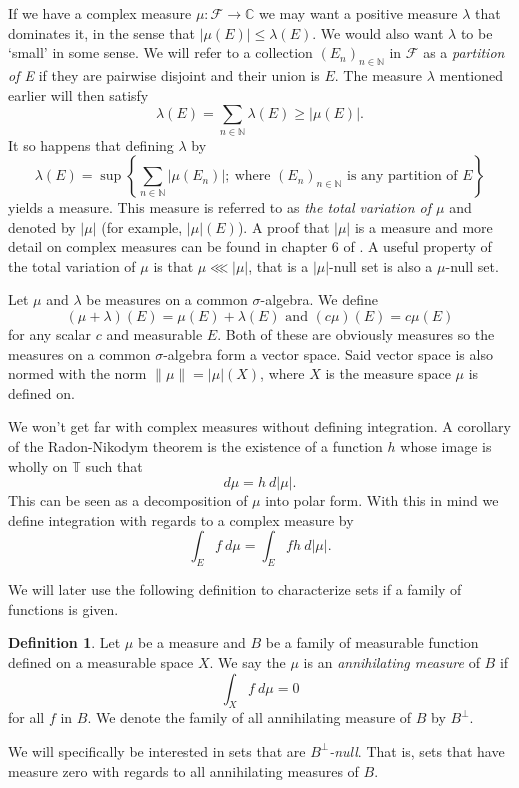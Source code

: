 \documentclass[a4paper,12pt,twoside,BCOR=10mm]{scrbook}
\theoremstyle{definition}
\theoremstyle{definition}
\theoremstyle{definition}
\newtheorem{definition}[theorem]{Definition}
\begin{document}
If we have a complex measure $\mu: \mathcal{F} \rightarrow \mathbb{C}$ we may want a positive measure $\lambda$ that dominates it, in the sense that $|\mu(E)| \leq \lambda(E)$.
We would also want $\lambda$ to be `small' in some sense.
We will refer to a collection $(E_n)_{n \in \mathbb{N}}$ in $\mathcal{F}$ as a \emph{partition of E} if they are pairwise disjoint and their union is $E$.
The measure $\lambda$ mentioned earlier will then satisfy
\[
	\lambda(E) = \sum_{n \in \mathbb{N}} \lambda(E) \geq |\mu(E)|.
\]
It so happens that defining $\lambda$ by
\[
	\lambda(E) = \sup \left \{\sum_{n \in \mathbb{N}}|\mu(E_n)|;\ \text{where }(E_n)_{n \in \mathbb{N}}\text{ is any partition of }E \right \}
\]
yields a measure.
This measure is referred to as \emph{the total variation of $\mu$} and denoted by $|\mu|$ (for example, $|\mu|(E)$).
A proof that $|\mu|$ is a measure and more detail on complex measures can be found in chapter $6$ of \citep{rudin2}. 
A useful property of the total variation of $\mu$ is that $\mu \lll |\mu|$, that is a $|\mu|$-null set is also a $\mu$-null set.

Let $\mu$ and $\lambda$ be measures on a common $\sigma$-algebra.
We define
\[
	(\mu + \lambda)(E) = \mu(E) + \lambda(E) \text{ and } (c\mu)(E) = c\mu(E)
\]
for any scalar $c$ and measurable $E$.
Both of these are obviously measures so the measures on a common $\sigma$-algebra form a vector space.
Said vector space is also normed with the norm $\|\mu\| = |\mu|(X)$, where $X$ is the measure space $\mu$ is defined on.

We won't get far with complex measures without defining integration.
A corollary of the Radon-Nikodym theorem is the existence of a function $h$ whose image is wholly on $\mathbb{T}$ such that
\[
	d\mu = h\ d|\mu|.
\]
This can be seen as a decomposition of $\mu$ into polar form.
With this in mind we define integration with regards to a complex measure by
\[
	\int_E f\ d\mu = \int_E fh\ d|\mu|.
\]

We will later use the following definition to characterize sets if a family of functions is given.
\begin{definition}
\label{annilatingmeasure}
Let $\mu$ be a measure and $B$ be a family of measurable function defined on a measurable space $X$.
We say the $\mu$ is an \emph{annihilating measure} of $B$ if
\[
	\int_X f\ d\mu = 0
\]
for all $f$ in $B$. We denote the family of all annihilating measure of $B$ by $B^{\bot}$.
\end{definition}
We will specifically be interested in sets that are \emph{$B^{\bot}$-null}.
That is, sets that have measure zero with regards to all annihilating measures of $B$.
\end{document}
